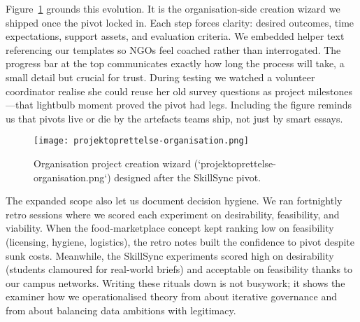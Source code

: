 Figure~\ref{fig:project-creation} grounds this evolution. It is the organisation-side creation wizard we shipped once the pivot locked in. Each step forces clarity: desired outcomes, time expectations, support assets, and evaluation criteria. We embedded helper text referencing our templates so NGOs feel coached rather than interrogated. The progress bar at the top communicates exactly how long the process will take, a small detail but crucial for trust. During testing we watched a volunteer coordinator realise she could reuse her old survey questions as project milestones---that lightbulb moment proved the pivot had legs. Including the figure reminds us that pivots live or die by the artefacts teams ship, not just by smart essays.

\begin{figure}[h]
  \centering
  \texttt{[image: projektoprettelse-organisation.png]}
  \caption{Organisation project creation wizard (`projektoprettelse-organisation.png`) designed after the SkillSync pivot.}
  \label{fig:project-creation}
\end{figure}

The expanded scope also let us document decision hygiene. We ran fortnightly retro sessions where we scored each experiment on desirability, feasibility, and viability. When the food-marketplace concept kept ranking low on feasibility (licensing, hygiene, logistics), the retro notes built the confidence to pivot despite sunk costs. Meanwhile, the SkillSync experiments scored high on desirability (students clamoured for real-world briefs) and acceptable on feasibility thanks to our campus networks. Writing these rituals down is not busywork; it shows the examiner how we operationalised theory from \citet{Choudary2016} about iterative governance and from \citet{Srnicek2017} about balancing data ambitions with legitimacy.
